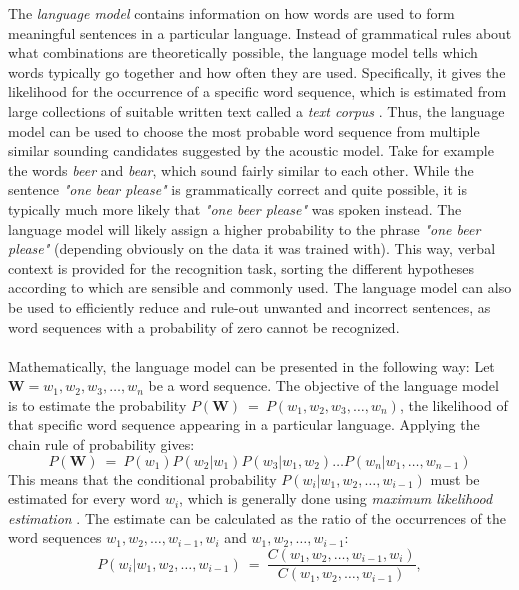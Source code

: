 \documentclass[english, 12pt, a4paper, pdftex, elec, utf8]{aaltothesis}
\begin{document}
The \textit{language model} contains information on how words are used to form meaningful sentences in a particular language. Instead of grammatical rules about what combinations are theoretically possible, the language model tells which words typically go together and how often they are used. Specifically, it gives the likelihood for the occurrence of a specific word sequence, which is estimated from large collections of suitable written text called a \textit{text corpus} \cite{kallasjoki2016}. Thus, the language model can be used to choose the most probable word sequence from multiple similar sounding candidates suggested by the acoustic model. Take for example the words \textit{beer} and \textit{bear}, which sound fairly similar to each other. While the sentence \textit{"one bear please"} is grammatically correct and quite possible, it is typically much more likely that \textit{"one beer please"} was spoken instead. The language model will likely assign a higher probability to the phrase \textit{"one beer please"} (depending obviously on the data it was trained with). This way, verbal context is provided for the recognition task, sorting the different hypotheses according to which are sensible and commonly used. The language model can also be used to efficiently reduce and rule-out unwanted and incorrect sentences, as word sequences with a probability of zero cannot be recognized. \\\\
Mathematically, the language model can be presented in the following way: Let $\bm{W} = w_1, w_2, w_3,\dots,w_n$ be a word sequence. The objective of the language model is to estimate the probability $P(\bm{W}) \ = \ P(w_1, w_2, w_3,\dots,w_n)$, the likelihood of that specific word sequence appearing in a particular language. Applying the chain rule of probability gives:
\begin{equation}
P(\bm{W}) \ = \ P(w_1) P(w_2|w_1) P(w_3|w_1,w_2) \dots P(w_n|w_1,\dots,w_{n-1})
\end{equation}
This means that the conditional probability $P(w_i|w_1,w_2,\dots,w_{i-1})$ must be estimated for every word $w_i$, which is generally done using \textit{maximum likelihood estimation} \cite{arisoy2008statistical}. The estimate can be calculated as the ratio of the occurrences of the word sequences $w_1,w_2,\dots,w_{i-1},w_i$ and $w_1,w_2,\dots,w_{i-1}$:
\begin{equation} \label{eq:ml}
P(w_i|w_1,w_2,\dots,w_{i-1}) \ = \ \frac{C(w_1,w_2,\dots,w_{i-1},w_i)}{C(w_1,w_2,\dots,w_{i-1})},
\end{equation}
\end{document}
